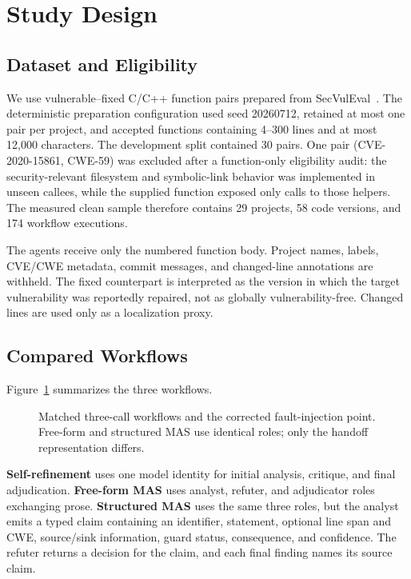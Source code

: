 \section{Study Design}

\subsection{Dataset and Eligibility}

We use vulnerable--fixed C/C++ function pairs prepared from SecVulEval~\cite{ahmed2025secvuleval}. The deterministic preparation configuration used seed 20260712, retained at most one pair per project, and accepted functions containing 4--300 lines and at most 12,000 characters. The development split contained 30 pairs. One pair (CVE-2020-15861, CWE-59) was excluded after a function-only eligibility audit: the security-relevant filesystem and symbolic-link behavior was implemented in unseen callees, while the supplied function exposed only calls to those helpers. The measured clean sample therefore contains 29 projects, 58 code versions, and 174 workflow executions.

The agents receive only the numbered function body. Project names, labels, CVE/CWE metadata, commit messages, and changed-line annotations are withheld. The fixed counterpart is interpreted as the version in which the target vulnerability was reportedly repaired, not as globally vulnerability-free. Changed lines are used only as a localization proxy.

\subsection{Compared Workflows}

Figure~\ref{fig:workflows} summarizes the three workflows.

\begin{figure}[t]
  \centering
  
  \caption{Matched three-call workflows and the corrected fault-injection point. Free-form and structured MAS use identical roles; only the handoff representation differs.}
  \label{fig:workflows}
\end{figure}

\textbf{Self-refinement} uses one model identity for initial analysis, critique, and final adjudication. \textbf{Free-form MAS} uses analyst, refuter, and adjudicator roles exchanging prose. \textbf{Structured MAS} uses the same three roles, but the analyst emits a typed claim containing an identifier, statement, optional line span and CWE, source/sink information, guard status, consequence, and confidence. The refuter returns a decision for the claim, and each final finding names its source claim.


